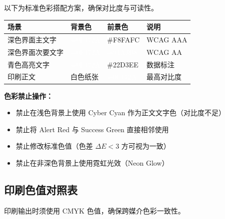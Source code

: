  以下为标准色彩搭配方案，确保对比度与可读性。

\begin{center}
\renewcommand{\arraystretch}{1.6}
\begin{tabularx}{\textwidth}{>{\centering\arraybackslash}p{3cm} >{\centering\arraybackslash}p{3cm} >{\centering\arraybackslash}p{3cm} X}
\toprule
\textbf{场景} & \textbf{背景色} & \textbf{前景色} & \textbf{说明} \\
\midrule
深色界面主文字 & \colorbox{DeepBlue}{\textcolor{white}{\footnotesize\#0F172A}} & \colorbox{white}{\footnotesize\#F8FAFC} & WCAG AAA \\
深色界面次要文字 & \colorbox{DeepBlue}{\textcolor{white}{\footnotesize\#0F172A}} & \colorbox{TextSecondary}{\textcolor{white}{\footnotesize\#94A3B8}} & WCAG AA \\
青色高亮文字 & \colorbox{DeepBlue}{\textcolor{white}{\footnotesize\#0F172A}} & \colorbox{CyberCyanLight}{\footnotesize\#22D3EE} & 数据标注 \\
印刷正文 & 白色纸张 & \colorbox{DeepBlue}{\textcolor{white}{\footnotesize\#0F172A}} & 最高对比度 \\
\bottomrule
\end{tabularx}
\end{center}

\begin{forbidbox}
\textbf{\color{AlertRed}色彩禁止操作：}
\begin{itemize}[leftmargin=1.5em,itemsep=2pt]
  \item 禁止在浅色背景上使用 Cyber Cyan 作为正文文字色（对比度不足）
  \item 禁止将 Alert Red 与 Success Green 直接相邻使用
  \item 禁止修改标准色值（色差 $\Delta E < 3$ 方可视为一致）
  \item 禁止在非深色背景上使用霓虹光效（Neon Glow）
\end{itemize}
\end{forbidbox}

\subsection{印刷色值对照表}

 印刷输出时须使用 CMYK 色值，确保跨媒介色彩一致性。


